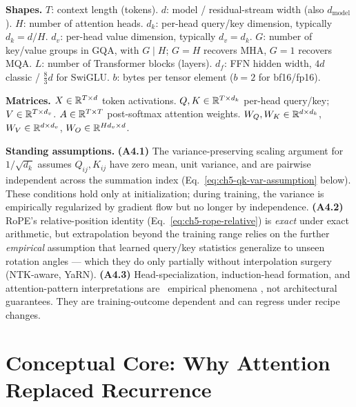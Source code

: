 \begin{notationbox}
\textbf{Shapes.}
$T$: context length (tokens). $d$: model / residual-stream width
(also $d_{\mathrm{model}}$). $H$: number of attention heads.
$d_k$: per-head query/key dimension, typically $d_k = d/H$.
$d_v$: per-head value dimension, typically $d_v = d_k$.
$G$: number of key/value groups in GQA, with $G \mid H$; $G = H$
recovers MHA, $G = 1$ recovers MQA.
$L$: number of Transformer blocks (layers).
$d_f$: FFN hidden width, $4d$ classic / $\tfrac{8}{3}d$ for SwiGLU.
$b$: bytes per tensor element ($b{=}2$ for bf16/fp16).

\textbf{Matrices.}
$X \in \mathbb{R}^{T\times d}$ token activations. $Q,K \in \mathbb{R}^{T\times d_k}$
per-head query/key; $V \in \mathbb{R}^{T\times d_v}$. $A \in \mathbb{R}^{T\times T}$
post-softmax attention weights. $W_Q, W_K \in \mathbb{R}^{d\times d_k}$,
$W_V \in \mathbb{R}^{d\times d_v}$, $W_O \in \mathbb{R}^{H d_v \times d}$.

\textbf{Standing assumptions.}
\textbf{(A4.1)} The variance-preserving scaling argument for
$1/\sqrt{d_k}$ assumes $Q_{ij}, K_{ij}$ have zero mean, unit
variance, and are pairwise independent across the summation index
(Eq.~\eqref{eq:ch5-qk-var-assumption} below). These conditions
hold only at initialization; during training, the variance is
empirically regularized by gradient flow but no longer by
independence.
\textbf{(A4.2)} RoPE's relative-position identity
(Eq.~\eqref{eq:ch5-rope-relative}) is \emph{exact} under exact
arithmetic, but extrapolation beyond the training range relies on
the further \emph{empirical} assumption that learned query/key
statistics generalize to unseen rotation angles --- which they do
only partially without interpolation surgery (NTK-aware, YaRN).
\textbf{(A4.3)} Head-specialization, induction-head formation, and
attention-pattern interpretations are \Emp\ empirical phenomena
\citep{elhage2021mathematical, olsson2022induction}, not
architectural guarantees. They are training-outcome dependent and
can regress under recipe changes.
\end{notationbox}

\section{Conceptual Core: Why Attention Replaced Recurrence}

